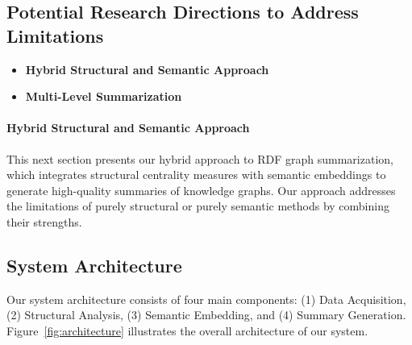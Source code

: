 \documentclass[article,submit,pdftex,moreauthors]{Definitions/mdpi}
\begin{document}
\subsection{Potential Research Directions to Address Limitations}

\begin{itemize}
    \item \textbf{Hybrid Structural and Semantic Approach}
    
    \item \textbf{Multi-Level Summarization}
    
\end{itemize}

\paragraph{\textbf{Hybrid Structural and Semantic Approach}}

This next section presents our hybrid approach to RDF graph summarization, which integrates structural centrality measures with semantic embeddings to generate high-quality summaries of knowledge graphs. Our approach addresses the limitations of purely structural or purely semantic methods by combining their strengths.

\subsection{System Architecture}
Our system architecture consists of four main components: (1) Data Acquisition, (2) Structural Analysis, (3) Semantic Embedding, and (4) Summary Generation. Figure~\ref{fig:architecture} illustrates the overall architecture of our system.
\end{document}
